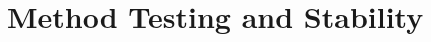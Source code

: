 \documentclass[../../CompleteThesis2/Complete_2ndDraft]{subfiles}
\begin{document}
%
%
%
%







\section[Testing and Stability][Testing and Stability]{Method Testing and Stability}
\label{Sec:Method_TestStab}
\end{document}
